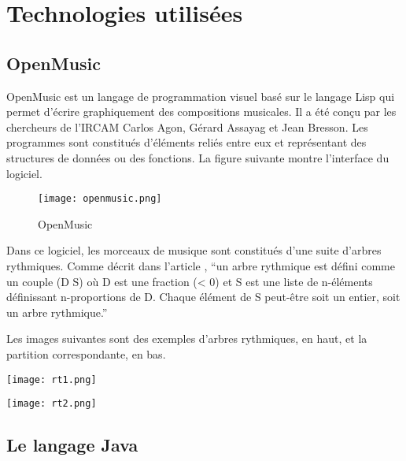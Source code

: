 \section{Technologies utilisées}

\subsection{OpenMusic}

OpenMusic \cite{openmusic} est un langage de programmation visuel basé sur le langage Lisp qui permet d'écrire graphiquement des compositions musicales. Il a été conçu par les chercheurs de l'IRCAM Carlos Agon, Gérard Assayag et Jean Bresson. Les programmes sont constitués d'éléments reliés entre eux et représentant des structures de données ou des fonctions. La figure suivante montre l'interface du logiciel.


\begin{figure}[!h] %
\centering
\texttt{[image: openmusic.png]}\\[1cm]
\caption{OpenMusic}
\label{OpenMusic}
\end{figure}

\par
Dans ce logiciel, les morceaux de musique sont constitués d'une suite d'arbres rythmiques. Comme décrit dans l'article \cite{agon}, \enquote{un arbre rythmique est défini comme un couple (D S) où D est une fraction (< 0) et S est une liste de n-éléments définissant n-proportions de D. Chaque élément de S peut-être soit un entier, soit un arbre rythmique.}

\par
Les images suivantes sont des exemples d'arbres rythmiques, en haut, et la partition correspondante, en bas.


\begin{minipage}[c]{.46\linewidth}
  \centering
  \texttt{[image: rt1.png]}\\[1cm]
\end{minipage}
\hfill
\begin{minipage}[c]{.46\linewidth}
  \centering
  \texttt{[image: rt2.png]}\\[1cm]
\end{minipage}



\subsection{Le langage Java}

